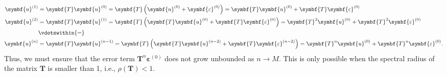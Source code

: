 \documentclass{article}
\begin{document}
\begin{align*}
    \symbf{u}^{\left( 1 \right)} & = \symbf{T} \symbf{u}^{\left( 0 \right)} = \symbf{T} \left( \symbf{u}^{\left( 0 \right)} + \symbf{\varepsilon}^{\left( 0 \right)} \right) = \symbf{T} \symbf{u}^{\left( 0 \right)} + \symbf{T} \symbf{\varepsilon}^{\left( 0 \right)}                                \\
    \symbf{u}^{\left( 2 \right)} & = \symbf{T} \symbf{u}^{\left( 1 \right)} = \symbf{T} \left( \symbf{T} \symbf{u}^{\left( 0 \right)} + \symbf{T} \symbf{\varepsilon}^{\left( 0 \right)} \right) = \symbf{T}^2 \symbf{u}^{\left( 0 \right)} + \symbf{T}^2 \symbf{\varepsilon}^{\left( 0 \right)}        \\
                                 & \vdotswithin{=}                                                                                                                                                                                                                                                      \\
    \symbf{u}^{\left( n \right)} & = \symbf{T} \symbf{u}^{\left( n-1 \right)} = \symbf{T} \left( \symbf{T} \symbf{u}^{\left( n-2 \right)} + \symbf{T} \symbf{\varepsilon}^{\left( n-2 \right)} \right) = \symbf{T}^n \symbf{u}^{\left( 0 \right)} + \symbf{T}^n \symbf{\varepsilon}^{\left( 0 \right)}.
\end{align*}
Thus, we must ensure that the error term \(\symbf{T}^n \symbf{\varepsilon}^{\left( 0 \right)}\)
does not grow unbounded as \(n \to M\). This is only possible when the
spectral radius of the matrix \(\symbf{T}\) is smaller than 1, i.e.,
\(\rho\left( \symbf{T} \right) < 1\).
\end{document}
